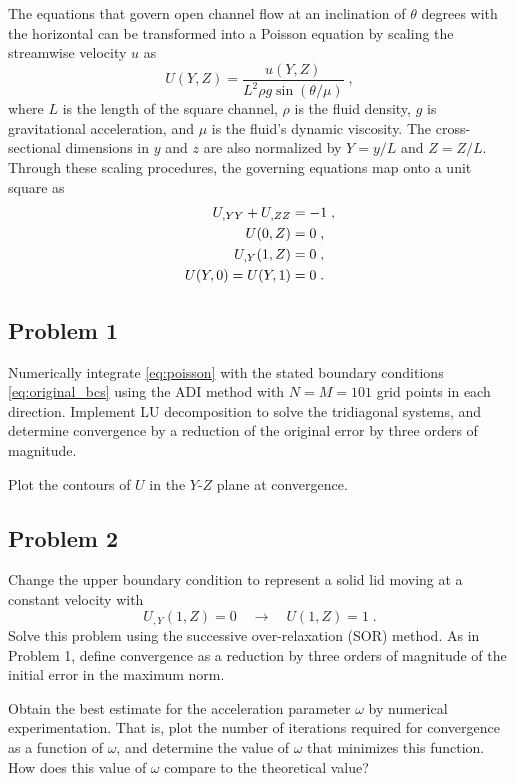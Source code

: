 \documentclass[11pt]{article}
\begin{document}
The equations that govern open channel flow at an inclination of $\theta$ degrees with the horizontal can be transformed into a Poisson equation by scaling the streamwise velocity $u$ as
\begin{equation}
U(Y,Z) = \frac{u(Y,Z)}{L^2 \rho g \sin(\theta / \mu)}
\;,
\end{equation}
where $L$ is the length of the square channel, $\rho$ is the fluid density, $g$ is gravitational acceleration, and $\mu$ is the fluid's dynamic viscosity. The cross-sectional dimensions in $y$ and $z$ are also normalized by $Y = y/L$ and $Z = Z/L$. Through these scaling procedures, the governing equations map onto a unit square as
\begin{align}
U_{,YY} + U_{,ZZ} &= -1
\;, \label{eq:poisson} \\
U(0,Z) &= 0
\;, \notag\\
U_{,Y}(1,Z) &= 0
\;, \notag\\
U(Y,0) = U(Y,1) &= 0
\;.
\label{eq:original_bcs}
\end{align}

\subsection{Problem 1}

Numerically integrate \eqref{eq:poisson} with the stated boundary conditions \eqref{eq:original_bcs} using the ADI method with $N = M = 101$ grid points in each direction. Implement LU decomposition to solve the tridiagonal systems, and determine convergence by a reduction of the original error by three orders of magnitude.

Plot the contours of $U$ in the $Y$-$Z$ plane at convergence.

\subsection{Problem 2}

Change the upper boundary condition to represent a solid lid moving at a constant velocity with
\begin{equation}
U_{,Y}(1,Z) = 0 \quad\longrightarrow\quad U(1,Z) = 1
\;.
\end{equation}
Solve this problem using the successive over-relaxation (SOR) method. As in Problem 1, define convergence as a reduction by three orders of magnitude of the initial error in the maximum norm.

Obtain the best estimate for the acceleration parameter $\omega$ by numerical experimentation. That is, plot the number of iterations required for convergence as a function of $\omega$, and determine the value of $\omega$ that minimizes this function. How does this value of $\omega$ compare to the theoretical value?
\end{document}
